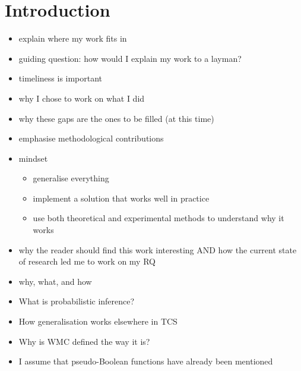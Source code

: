 \chapter{Introduction} %

\begin{itemize}
\item explain where my work fits in
\item guiding question: how would I explain my work to a layman?
\item timeliness is important
\item why I chose to work on what I did
\item why these gaps are the ones to be filled (at this time)
\item emphasise methodological contributions
\item mindset
  \begin{itemize}
  \item generalise everything
  \item implement a solution that works well in practice
  \item use both theoretical and experimental methods to understand why it works
  \end{itemize}
\item why the reader should find this work interesting AND how the current state of research led me to work on my RQ
\item why, what, and how
\end{itemize}

\begin{itemize}
\item What is probabilistic inference?
\item How generalisation works elsewhere in TCS
\item Why is WMC defined the way it is?
\item I assume that pseudo-Boolean functions have already been mentioned
\end{itemize}




